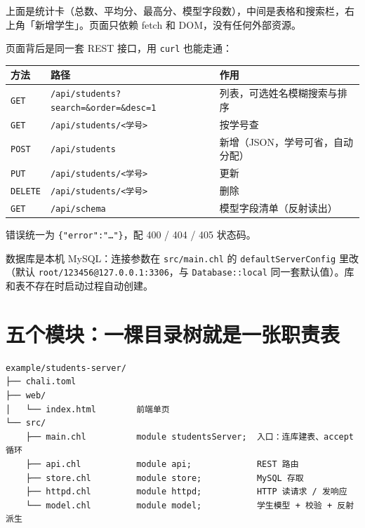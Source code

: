 上面是统计卡（总数、平均分、最高分、模型字段数），中间是表格和搜索栏，右上角「新增学生」。页面只依赖 fetch 和 DOM，没有任何外部资源。

页面背后是同一套 REST 接口，用 \texttt{curl} 也能走通：

\begin{center}
\begin{tabular}{lll}
\toprule
方法 & 路径 & 作用 \\
\midrule
\texttt{GET} & \texttt{/\allowbreak{}api/\allowbreak{}students?search=\allowbreak{}\&order=\allowbreak{}\&desc=\allowbreak{}1} & 列表，可选姓名模糊搜索与排序 \\
\texttt{GET} & \texttt{/\allowbreak{}api/\allowbreak{}students/\allowbreak{}<\allowbreak{}学号>\allowbreak{}} & 按学号查 \\
\texttt{POST} & \texttt{/\allowbreak{}api/\allowbreak{}students} & 新增（JSON，学号可省，自动分配） \\
\texttt{PUT} & \texttt{/\allowbreak{}api/\allowbreak{}students/\allowbreak{}<\allowbreak{}学号>\allowbreak{}} & 更新 \\
\texttt{DELETE} & \texttt{/\allowbreak{}api/\allowbreak{}students/\allowbreak{}<\allowbreak{}学号>\allowbreak{}} & 删除 \\
\texttt{GET} & \texttt{/\allowbreak{}api/\allowbreak{}schema} & 模型字段清单（反射读出） \\
\bottomrule
\end{tabular}
\end{center}

错误统一为 \texttt{\{"error":\allowbreak{}"…"\}}，配 400 / 404 / 405 状态码。

数据库是本机 MySQL：连接参数在 \texttt{src/\allowbreak{}main.\allowbreak{}chl} 的 \texttt{default\allowbreak{}Server\allowbreak{}Config} 里改（默认 \texttt{root/\allowbreak{}123456@127.\allowbreak{}0.\allowbreak{}0.\allowbreak{}1:\allowbreak{}3306}，与 \texttt{Database:\allowbreak{}:\allowbreak{}local} 同一套默认值）。库和表不存在时启动过程自动创建。

\section{五个模块：一棵目录树就是一张职责表}

\par
\medskip
\begin{lstlisting}[style=out]
example/students-server/
├── chali.toml
├── web/
│   └── index.html        前端单页
└── src/
    ├── main.chl          module studentsServer;  入口：连库建表、accept 循环
    ├── api.chl           module api;             REST 路由
    ├── store.chl         module store;           MySQL 存取
    ├── httpd.chl         module httpd;           HTTP 读请求 / 发响应
    └── model.chl         module model;           学生模型 + 校验 + 反射派生
\end{lstlisting}
\par
\medskip

